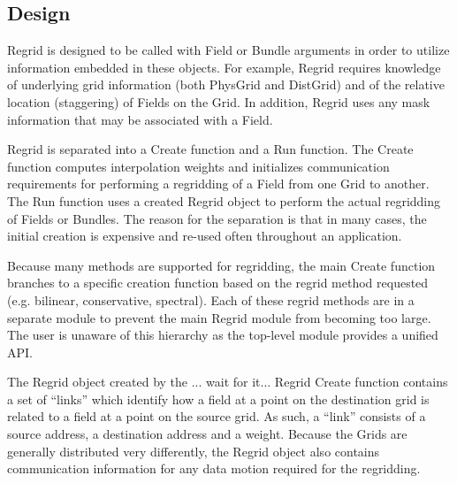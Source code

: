 
\subsection{Design}

Regrid is designed to be called with Field or Bundle
arguments in order to utilize information embedded in
these objects.  For example, Regrid requires knowledge
of underlying grid information (both PhysGrid and DistGrid)
and of the relative location (staggering) of Fields on
the Grid.  In addition, Regrid uses any mask information
that may be associated with a Field.

Regrid is separated into a Create function and a
Run function. The Create function computes
interpolation weights and initializes communication
requirements for performing a regridding of a Field
from one Grid to another.  The Run function uses
a created Regrid object to perform the actual regridding
of Fields or Bundles.  The reason for the separation
is that in many cases, the initial creation is
expensive and re-used often throughout an application.

Because many methods are supported for regridding,
the main Create function branches to a specific
creation function based on the regrid method requested
(e.g. bilinear, conservative, spectral).  Each of
these regrid methods are in a separate module to 
prevent the main Regrid module from becoming too
large.  The user is unaware of this hierarchy as the
top-level module provides a unified API.

The Regrid object created by the ... wait for it...
Regrid Create function contains a set of ``links''
which identify how a field at a point on the 
destination grid is related to a field at a 
point on the source grid.  As such, a ``link''
consists of a source address, a destination address
and a weight.  Because the Grids are generally
distributed very differently, the Regrid object
also contains communication information 
for any data motion required for the regridding.
 
